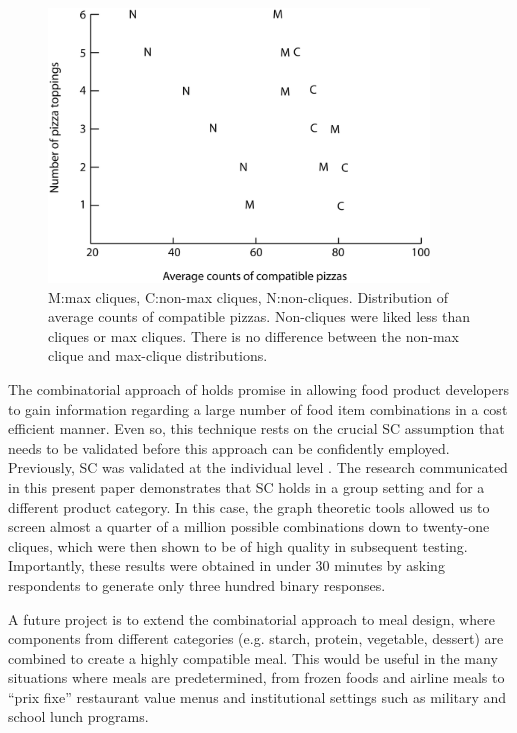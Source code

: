 \begin{figure}[h!]
\caption[Distribution of average counts of compatible pizzas.]{M:max cliques, C:non-max cliques, N:non-cliques.  Distribution of average counts of compatible pizzas.  Non-cliques were liked less than cliques or max cliques.  There is no difference between the non-max clique and max-clique distributions.}
\label{fig:pizzdist}
\centering
\includegraphics[width=0.9\textwidth]{./img/Figure44.png}
\end{figure}

The combinatorial approach of \citet{Ennis2010} holds promise in allowing food product developers to gain information regarding a large number of food item combinations in a cost efficient manner.  Even so, this technique rests on the crucial SC assumption that needs to be validated before this approach can be confidently employed.  Previously, SC was validated at the individual level \citep{Nestrud2010a}. The research communicated in this present paper demonstrates that SC holds in a group setting and for a different product category.  In this case, the graph theoretic tools allowed us to screen almost a quarter of a million possible combinations down to twenty-one cliques, which were then shown to be of high quality in subsequent testing.  Importantly, these results were obtained in under 30 minutes by asking respondents to generate only three hundred binary responses. 

A future project is to extend the combinatorial approach to meal design, where components from different categories (e.g. starch, protein, vegetable, dessert) are combined to create a highly compatible meal.  This would be useful in the many situations where meals are predetermined, from frozen foods and airline meals to “prix fixe” restaurant value menus and institutional settings such as military and school lunch programs.

